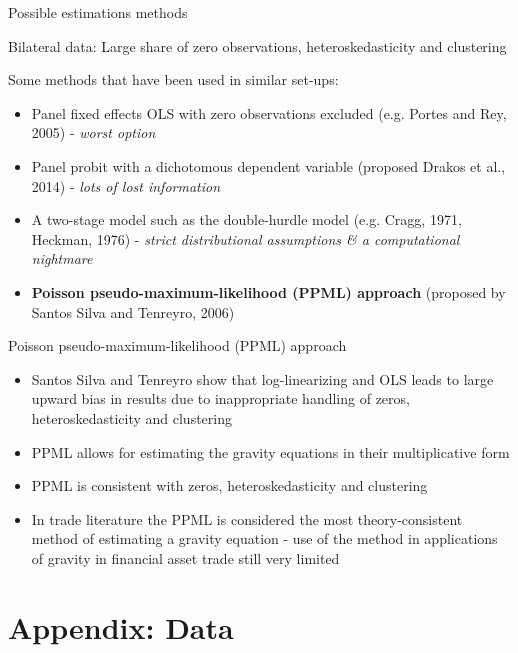 \documentclass{beamer}
\begin{document}
\begin{frame}{Possible estimations methods}
\begin{block}{Bilateral data:}
Large share of zero observations, heteroskedasticity and clustering
\end{block}

\begin{block}{Some methods that have been used in similar set-ups:}
\begin{itemize}
\item Panel fixed effects OLS with zero observations excluded (e.g. Portes and Rey, 2005) - \textit{worst option}
\item Panel probit with a dichotomous dependent variable (proposed Drakos et al., 2014) - \textit{lots of lost information}
\item A two-stage model such as the double-hurdle model (e.g. Cragg, 1971, Heckman, 1976) - \textit{strict distributional assumptions \& a computational nightmare}
\item \textbf{Poisson pseudo-maximum-likelihood (PPML) approach} (proposed by Santos Silva and Tenreyro, 2006)
   \end{itemize}
\end{block}
\end{frame}

\begin{frame}{Poisson pseudo-maximum-likelihood (PPML) approach}
\begin{itemize}
\item Santos Silva and Tenreyro show that log-linearizing and OLS leads to large upward bias in results due to inappropriate handling of zeros, heteroskedasticity and clustering
\item PPML allows for estimating the gravity equations in their multiplicative form
\item PPML is consistent with zeros, heteroskedasticity and clustering
\item In trade literature the PPML is considered the most theory-consistent method of estimating a gravity equation - use of the method in applications of gravity in financial asset trade still very limited 
\end{itemize}
\end{frame}

\section{Appendix: Data}
\end{document}
